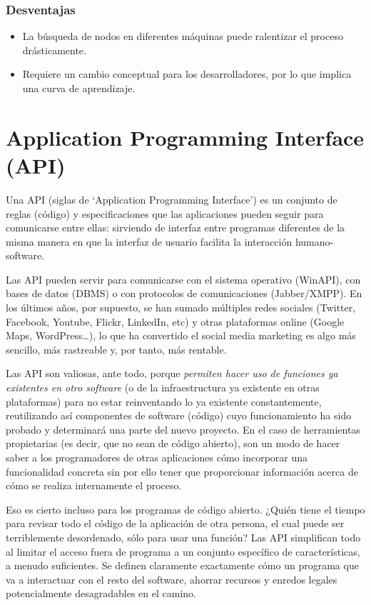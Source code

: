 		\subsubsection{Desventajas}
		\begin{itemize}
		 \item La búsqueda de nodos en diferentes máquinas puede ralentizar el proceso drásticamente.
		 \item Requiere un cambio conceptual para los desarrolladores, por lo que implica una curva de aprendizaje.
		\end{itemize}\cite{9}


 \section{Application Programming Interface (API)}
 	Una API (siglas de ‘Application Programming Interface’) es un conjunto de reglas (código) y especificaciones que las aplicaciones pueden seguir para comunicarse entre ellas: sirviendo de interfaz entre programas diferentes de la misma manera en que la interfaz de usuario facilita la interacción humano-software.

	Las API pueden servir para comunicarse con el sistema operativo (WinAPI), con bases de datos (DBMS) o con protocolos de comunicaciones (Jabber/XMPP). En los últimos años, por supuesto, se han sumado múltiples redes sociales (Twitter, Facebook, Youtube, Flickr, LinkedIn, etc) y otras plataformas online (Google Maps, WordPress…), lo que ha convertido el social media marketing es algo más sencillo, más rastreable y, por tanto, más rentable.

	Las API son valiosas, ante todo, porque \emph{permiten hacer uso de funciones ya existentes en otro software} (o de la infraestructura ya existente en otras plataformas) para no estar reinventando lo ya existente constantemente, reutilizando así componentes de software (código) cuyo funcionamiento ha sido probado y determinará una parte del nuevo proyecto. En el caso de herramientas propietarias (es decir, que no sean de código abierto), son un modo de hacer saber a los programadores de otras aplicaciones cómo incorporar una funcionalidad concreta sin por ello tener que proporcionar información acerca de cómo se realiza internamente el proceso. \cite{3}

	Eso es cierto incluso para los programas de código abierto. ¿Quién tiene el tiempo para revisar todo el código de la aplicación de otra persona, el cual puede ser terriblemente desordenado, sólo para usar una función? Las API simplifican todo al limitar el acceso fuera de programa a un conjunto específico de características, a menudo suficientes. Se definen claramente exactamente cómo un programa que va a interactuar con el resto del software, ahorrar recursos y enredos legales potencialmente desagradables en el camino. \cite{10}

